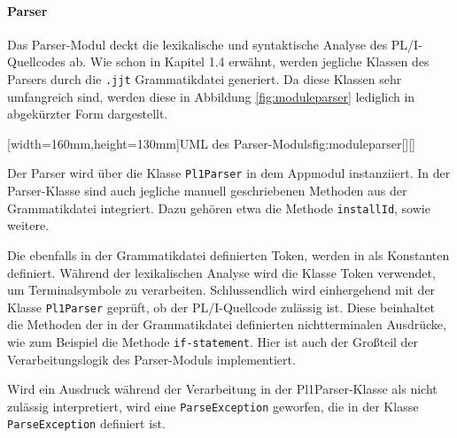 
\paragraph*{Parser}
Das Parser-Modul deckt die lexikalische und syntaktische Analyse des PL/I-Quellcodes ab. Wie schon in Kapitel 1.4 erwähnt, werden jegliche Klassen des Parsers durch die \verb+.jjt+ Grammatikdatei generiert. Da diese Klassen sehr umfangreich sind, werden diese in Abbildung \ref{fig:moduleparser} lediglich in abgekürzter Form dargestellt. 

[width=160mm,height=130mm]{UML des Parser-Moduls}{fig:moduleparser}[][]
\pagebreak

Der Parser wird über die Klasse \verb+Pl1Parser+ in dem Appmodul instanziiert. In der Parser-Klasse sind auch jegliche manuell geschriebenen Methoden aus der Grammatikdatei integriert. 
Dazu gehören etwa die Methode \verb+installId+, sowie weitere. 

Die ebenfalls in der Grammatikdatei definierten Token, 
werden in  als Konstanten definiert. 
Während der lexikalischen Analyse wird die Klasse Token verwendet, um Terminalsymbole zu verarbeiten. 
Schlussendlich wird einhergehend mit der Klasse \verb+Pl1Parser+ geprüft, ob der PL/I-Quellcode zulässig ist. 
Diese beinhaltet die Methoden der in der Grammatikdatei definierten nichtterminalen Ausdrücke, wie zum Beispiel die Methode \verb+if-statement+. 
Hier ist auch der Großteil der Verarbeitungslogik des Parser-Moduls implementiert.

Wird ein Ausdruck während der Verarbeitung in der Pl1Parser-Klasse als nicht zulässig  interpretiert, wird eine \verb+ParseException+ geworfen, die in der Klasse \verb+ParseException+ definiert ist.

